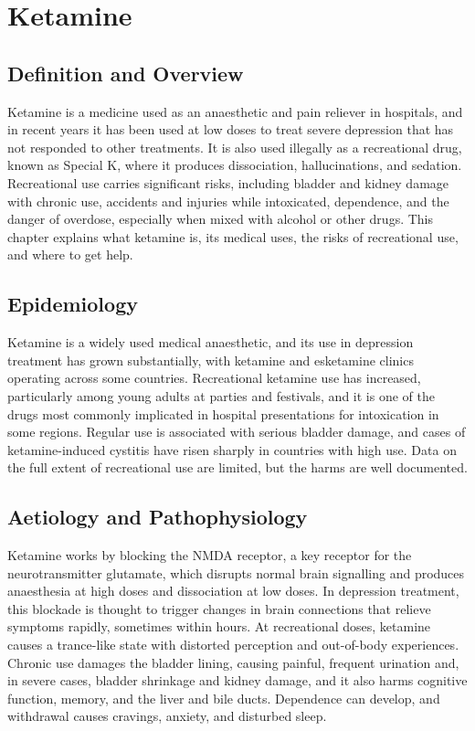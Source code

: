 \chapter{Ketamine}

\section*{Definition and Overview}
Ketamine is a medicine used as an anaesthetic and pain reliever in hospitals, and in recent years it has been used at low doses to treat severe depression that has not responded to other treatments. It is also used illegally as a recreational drug, known as Special K, where it produces dissociation, hallucinations, and sedation. Recreational use carries significant risks, including bladder and kidney damage with chronic use, accidents and injuries while intoxicated, dependence, and the danger of overdose, especially when mixed with alcohol or other drugs. This chapter explains what ketamine is, its medical uses, the risks of recreational use, and where to get help.

\section*{Epidemiology}
Ketamine is a widely used medical anaesthetic, and its use in depression treatment has grown substantially, with ketamine and esketamine clinics operating across some countries. Recreational ketamine use has increased, particularly among young adults at parties and festivals, and it is one of the drugs most commonly implicated in hospital presentations for intoxication in some regions. Regular use is associated with serious bladder damage, and cases of ketamine-induced cystitis have risen sharply in countries with high use. Data on the full extent of recreational use are limited, but the harms are well documented.

\section*{Aetiology and Pathophysiology}
Ketamine works by blocking the NMDA receptor, a key receptor for the neurotransmitter glutamate, which disrupts normal brain signalling and produces anaesthesia at high doses and dissociation at low doses. In depression treatment, this blockade is thought to trigger changes in brain connections that relieve symptoms rapidly, sometimes within hours. At recreational doses, ketamine causes a trance-like state with distorted perception and out-of-body experiences. Chronic use damages the bladder lining, causing painful, frequent urination and, in severe cases, bladder shrinkage and kidney damage, and it also harms cognitive function, memory, and the liver and bile ducts. Dependence can develop, and withdrawal causes cravings, anxiety, and disturbed sleep.

